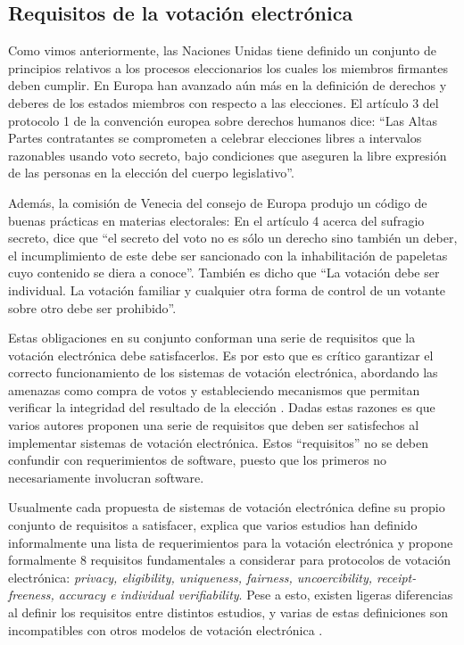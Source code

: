 \newpage
\subsection{Requisitos de la votación electrónica}

Como vimos anteriormente, las Naciones Unidas tiene definido un conjunto de principios
relativos a los procesos eleccionarios los cuales los miembros firmantes deben cumplir.
En Europa han avanzado aún más en la definición de derechos y deberes de los estados
miembros con respecto a las elecciones. El artículo 3 del protocolo 1 de la convención europea sobre 
derechos humanos \cite{EuropeanCourtofHumanRights2013} dice: 
``Las Altas Partes contratantes se comprometen a celebrar elecciones libres a 
intervalos razonables usando voto secreto, bajo condiciones que aseguren la libre
expresión de las personas en la elección del cuerpo legislativo''. 

Además, la comisión de Venecia del consejo de Europa  \cite{CouncilofEurope-VeniceCommission2002}
 produjo un código de buenas prácticas en materias electorales: En el artículo 4 acerca del sufragio 
secreto, dice que ``el secreto del voto no es sólo un derecho sino también un deber, el 
incumplimiento de este debe ser sancionado con la inhabilitación 
de papeletas cuyo contenido se diera a conoce''. También es dicho que ``La votación debe
ser individual. La votación familiar y cualquier otra forma de control de un votante
sobre otro debe ser prohibido''.

Estas obligaciones en su conjunto conforman una serie de requisitos que la
votación electrónica debe satisfacerlos. Es por esto que es crítico garantizar el correcto funcionamiento 
de los sistemas de votación electrónica, abordando las amenazas como compra de votos y 
estableciendo mecanismos que permitan verificar la integridad del resultado de la elección \cite{Weber} . 
Dadas estas razones es que varios autores proponen una serie de requisitos que deben ser 
satisfechos al implementar sistemas de votación electrónica. Estos ``requisitos'' no se deben confundir
con requerimientos de software, puesto que los primeros no necesariamente involucran software.

Usualmente cada propuesta de sistemas de votación electrónica define su propio conjunto
de requisitos a satisfacer, \cite{Cetinkaya2008} explica que varios estudios han definido informalmente 
una lista de requerimientos para la votación electrónica y propone formalmente
8 requisitos fundamentales a considerar para protocolos de votación 
electrónica: \textit{privacy, eligibility, uniqueness, fairness, uncoercibility,
receipt-freeness, accuracy e individual verifiability}. Pese a esto,
existen ligeras diferencias al definir los requisitos entre distintos estudios, y varias de
estas definiciones son incompatibles con otros modelos de votación electrónica \cite{Braunlich2013}. 

